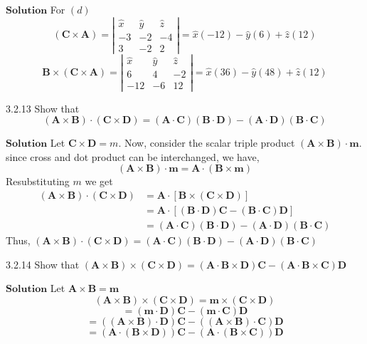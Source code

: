 \documentclass{styles/kaobook}
\begin{document}
$\boxed{\textbf{Solution}}$ For $(d)$ 
$$(\mathbf{C} \times \mathbf{A})=\left|\begin{array}{ccc}\hat{x} & \hat{y} & \hat{z} \\ -3 & -2 & -4 \\ 3 & -2 & 2\end{array}\right|=\hat{x}(-12)-\hat{y}(6)+\hat{z}(12)$$
$$\mathbf{B} \times(\mathbf{C} \times \mathbf{A})=\left|\begin{array}{ccc}\hat{x} & \hat{y} & \hat{z} \\ 6 & 4 & -2 \\ -12 & -6 & 12\end{array}\right|=\hat{x}(36)-\hat{y}(48)+\hat{z}(12)$$



\begin{greenbox}{3.2.13}
Show that
$$
(\mathbf{A} \times \mathbf{B}) \cdot(\mathbf{C} \times \mathbf{D})=(\mathbf{A} \cdot \mathbf{C})(\mathbf{B} \cdot \mathbf{D})-(\mathbf{A} \cdot \mathbf{D})(\mathbf{B} \cdot \mathbf{C})
$$
\end{greenbox}

$\boxed{\textbf{Solution}}$ Let $\mathbf{C} \times \mathbf{D}=m$.
Now, consider the scalar triple product $(\mathbf{A} \times \mathbf{B}) \cdot \mathbf{m}$.
since cross and dot product can be interchanged, we have,
$$
(\mathbf{A} \times \mathbf{B}) \cdot \mathbf{m}=\mathbf{A} \cdot(\mathbf{B} \times \mathbf{m})
$$
Resubstituting $m$ we get
$$\begin{aligned}(\mathbf{A} \times \mathbf{B}) \cdot(\mathbf{C} \times \mathbf{D}) &=\mathbf{A} \cdot[\mathbf{B} \times(\mathbf{C} \times \mathbf{D})] \\ &=\mathbf{A} \cdot[(\mathbf{B} \cdot \mathbf{D}) \mathbf{C}-(\mathbf{B} \cdot \mathbf{C})\mathbf{D}] \\ &=(\mathbf{A} \cdot \mathbf{C})(\mathbf{B} \cdot \mathbf{D})-(\mathbf{A} \cdot \mathbf{D})(\mathbf{B} \cdot \mathbf{C}) \end{aligned}$$
Thus, $(\mathbf{A} \times \mathbf{B}) \cdot(\mathbf{C} \times \mathbf{D})=(\mathbf{A} \cdot \mathbf{C})(\mathbf{B} \cdot \mathbf{D})-(\mathbf{A} \cdot \mathbf{D})(\mathbf{B} \cdot \mathbf{C})$




\begin{greenbox}{3.2.14}
Show that
$(\mathbf{A} \times \mathbf{B}) \times(\mathbf{C} \times \mathbf{D})=(\mathbf{A} \cdot \mathbf{B} \times \mathbf{D}) \mathbf{C}-(\mathbf{A} \cdot \mathbf{B} \times \mathbf{C}) \mathbf{D}$
\end{greenbox}
$\boxed{\textbf{Solution}}$ Let $\mathbf{A} \times \mathbf{B}=\mathbf{m}$
$$(\mathbf{A} \times \mathbf{B}) \times(\mathbf{C} \times \mathbf{D})=\mathbf{m} \times(\mathbf{C} \times \mathbf{D})$$
$$=(\mathbf{m} \cdot \mathbf{D}) \mathbf{C}-(\mathbf{m} \cdot \mathbf{C})\mathbf{D}$$
$$=((\mathbf{A} \times \mathbf{B}) \cdot \mathbf{D}) \mathbf{C}-((\mathbf{A} \times \mathbf{B}) \cdot \mathbf{C})\mathbf{D}$$
$$=(\mathbf{A} \cdot(\mathbf{B} \times \mathbf{D})) \mathbf{C}-(\mathbf{A} \cdot(\mathbf{B} \times \mathbf{C}))\mathbf{D}$$
\end{document}
